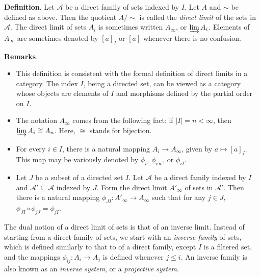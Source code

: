 \documentclass[12pt]{article}
\begin{document}
\textbf{Definition}.  Let $\mathcal{A}$ be a direct family of sets indexed by $I$.  Let $A$ and $\sim$ be defined as above.  Then the quotient $A/\sim$ is called the \emph{direct limit} of the sets in $\mathcal{A}$.  The direct limit of sets $A_i$ is sometimes written $A_{\infty}$, or $\varinjlim A_i$.  Elements of $A_{\infty}$ are sometimes denoted by $[a]_I$ or $[a]$ whenever there is no confusion.

\textbf{Remarks}.  
\begin{itemize}
\item
This definition is consistent with the formal definition of direct limits in a category.  The index $I$, being a directed set, can be viewed as a category whose objects are elements of $I$ and morphisms defined by the partial order on $I$.
\item
The notation $A_{\infty}$ comes from the following fact: if $|I|=n<\infty$, then $\varinjlim A_i\cong A_n$.  Here, $\cong$ stands for bijection.
\item
For every $i\in I$, there is a natural mapping $A_i\to A_{\infty}$, given by $a\mapsto [a]_I$.  This map may be variously denoted by $\phi_{i}$, $\phi_{i\infty}$, or $\phi_{iI}$.
\item 
Let $J$ be a subset of a directed set $I$.  Let $\mathcal{A}$ be a direct family indexed by $I$ and $\mathcal{A}'\subseteq \mathcal{A}$ indexed by $J$.  Form the direct limit $A'_{\infty}$ of sets in $\mathcal{A}'$.  Then there is a natural mapping $\phi_{JI}:A'_{\infty}\to A_{\infty}$ such that for any $j\in J$, $\phi_{JI}\circ \phi_{jJ}=\phi_{jI}$.
\end{itemize}

The dual notion of a direct limit of sets is that of an inverse limit.  Instead of starting from a direct family of sets, we start with an \emph{inverse family} of sets, which is defined similarly to that to of a direct family, except $I$ is a filtered set, and the mappings $\phi_{ij}:A_i\to A_j$ is defined whenever $j\le i$.  An inverse family is also known as an \emph{inverse system}, or a \emph{projective system}.
\end{document}
